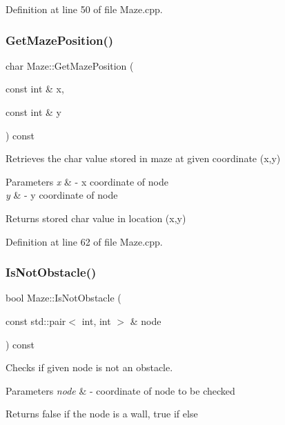 Definition at line 50 of file Maze.\+cpp.

\mbox{\label{class_maze_a951b00bd297fc74c0543e89a48958d39}} 
\subsubsection{\texorpdfstring{GetMazePosition()}{GetMazePosition()}}
{\footnotesize\ttfamily char Maze\+::\+Get\+Maze\+Position (\begin{DoxyParamCaption}\item[{const int \&}]{x,  }\item[{const int \&}]{y }\end{DoxyParamCaption}) const}



Retrieves the char value stored in maze at given coordinate (x,y) 


\begin{DoxyParams}{Parameters}
{\em x} & -\/ x coordinate of node \\
\hline
{\em y} & -\/ y coordinate of node \\
\hline
\end{DoxyParams}
\begin{DoxyReturn}{Returns}
stored char value in location (x,y) 
\end{DoxyReturn}


Definition at line 62 of file Maze.\+cpp.

\mbox{\label{class_maze_a8536c76dd1f35dee26c3a079d81cb0b4}} 
\subsubsection{\texorpdfstring{IsNotObstacle()}{IsNotObstacle()}}
{\footnotesize\ttfamily bool Maze\+::\+Is\+Not\+Obstacle (\begin{DoxyParamCaption}\item[{const std\+::pair$<$ int, int $>$ \&}]{node }\end{DoxyParamCaption}) const}



Checks if given node is not an obstacle. 


\begin{DoxyParams}{Parameters}
{\em node} & -\/ coordinate of node to be checked \\
\hline
\end{DoxyParams}
\begin{DoxyReturn}{Returns}
false if the node is a wall, true if else 
\end{DoxyReturn}


